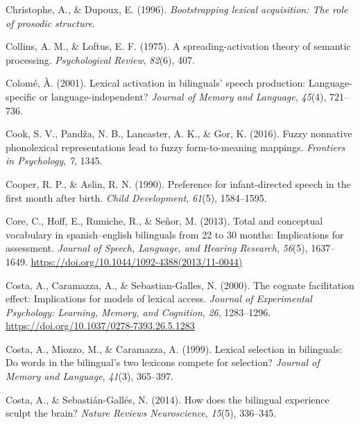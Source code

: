 \documentclass[
  12pt,
  b5paperpaper,
  twoside]{scrreprt}
\newlength{\cslhangindent}
\newlength{\cslentryspacingunit} %
\newenvironment{CSLReferences}[2] %
 {%
  \setlength{\parindent}{0pt}
  \ifodd #1
  \let\oldpar\par
  \def\par{\hangindent=\cslhangindent\oldpar}
  \fi
  \setlength{\parskip}{#2\cslentryspacingunit}
 }%
 {}
\begin{document}
\begin{CSLReferences}{1}{0}
\leavevmode{}%
Christophe, A., \& Dupoux, E. (1996). \emph{Bootstrapping lexical
acquisition: The role of prosodic structure}.

\leavevmode{}%
Collins, A. M., \& Loftus, E. F. (1975). A spreading-activation theory
of semantic processing. \emph{Psychological Review}, \emph{82}(6), 407.

\leavevmode{}%
Colomé, À. (2001). Lexical activation in bilinguals' speech production:
Language-specific or language-independent? \emph{Journal of Memory and
Language}, \emph{45}(4), 721--736.

\leavevmode{}%
Cook, S. V., Pandža, N. B., Lancaster, A. K., \& Gor, K. (2016). Fuzzy
nonnative phonolexical representations lead to fuzzy form-to-meaning
mappings. \emph{Frontiers in Psychology}, \emph{7}, 1345.

\leavevmode{}%
Cooper, R. P., \& Aslin, R. N. (1990). Preference for infant-directed
speech in the first month after birth. \emph{Child Development},
\emph{61}(5), 1584--1595.

\leavevmode{}%
Core, C., Hoff, E., Rumiche, R., \& Señor, M. (2013). Total and
conceptual vocabulary in spanish--english bilinguals from 22 to 30
months: Implications for assessment. \emph{Journal of Speech, Language,
and Hearing Research}, \emph{56}(5), 1637--1649.
\url{https://doi.org/10.1044/1092-4388(2013/11-0044)}

\leavevmode{}%
Costa, A., Caramazza, A., \& Sebastian-Galles, N. (2000). The cognate
facilitation effect: Implications for models of lexical access.
\emph{Journal of Experimental Psychology: Learning, Memory, and
Cognition}, \emph{26}, 1283--1296.
\url{https://doi.org/10.1037/0278-7393.26.5.1283}

\leavevmode{}%
Costa, A., Miozzo, M., \& Caramazza, A. (1999). Lexical selection in
bilinguals: Do words in the bilingual's two lexicons compete for
selection? \emph{Journal of Memory and Language}, \emph{41}(3),
365--397.

\leavevmode{}%
Costa, A., \& Sebastián-Gallés, N. (2014). How does the bilingual
experience sculpt the brain? \emph{Nature Reviews Neuroscience},
\emph{15}(5), 336--345.


\end{CSLReferences}
\end{document}
